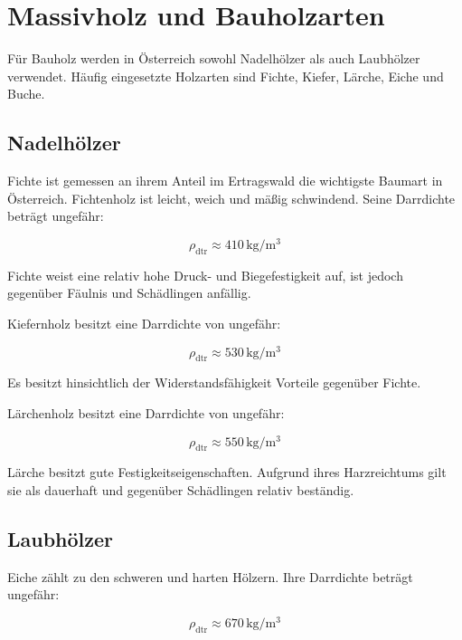 \documentclass[
  12pt,
  a4paper,
  oneside
]{scrreprt}
\begin{document}
\section{Massivholz und Bauholzarten}

Für Bauholz werden in Österreich sowohl Nadelhölzer als auch Laubhölzer
verwendet. Häufig eingesetzte Holzarten sind Fichte, Kiefer, Lärche,
Eiche und Buche. 

\subsection{Nadelhölzer}

Fichte ist gemessen an ihrem Anteil im Ertragswald die wichtigste
Baumart in Österreich. Fichtenholz ist leicht, weich und mäßig
schwindend. Seine Darrdichte beträgt ungefähr:

\begin{equation}
  \rho_{\mathrm{dtr}} \approx 410\,\mathrm{kg/m^3}
\end{equation}

Fichte weist eine relativ hohe Druck- und Biegefestigkeit auf, ist
jedoch gegenüber Fäulnis und Schädlingen anfällig. 

Kiefernholz besitzt eine Darrdichte von ungefähr:

\begin{equation}
  \rho_{\mathrm{dtr}} \approx 530\,\mathrm{kg/m^3}
\end{equation}

Es besitzt hinsichtlich der Widerstandsfähigkeit Vorteile gegenüber
Fichte. 

Lärchenholz besitzt eine Darrdichte von ungefähr:

\begin{equation}
  \rho_{\mathrm{dtr}} \approx 550\,\mathrm{kg/m^3}
\end{equation}

Lärche besitzt gute Festigkeitseigenschaften. Aufgrund ihres
Harzreichtums gilt sie als dauerhaft und gegenüber Schädlingen relativ
beständig. 

\subsection{Laubhölzer}

Eiche zählt zu den schweren und harten Hölzern. Ihre Darrdichte beträgt
ungefähr:

\begin{equation}
  \rho_{\mathrm{dtr}} \approx 670\,\mathrm{kg/m^3}
\end{equation}
\end{document}
